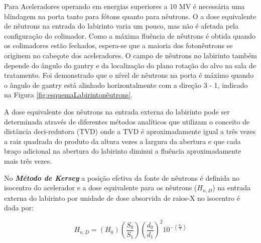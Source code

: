 \documentclass[11pt,a4paper]{article}
\begin{document}
        Para Aceleradores operando em energias superiores a 10 MV é necessária uma blindagem na porta tanto para fótons quanto para nêutrons. O a dose equivalente de nêutrons na entrada do labirinto varia um pouco, mas não é afetada pela configuração do colimador. Como a máxima fluência de nêutrons é obtida quando os colimadores estão fechados, espera-se que a maioria dos fotonêutrons se originem no cabeçote dos aceleradores. O campo de nêutrons no labirinto também depende do ângulo do gantry e da localização do plano rotação do alvo na sala de tratamento. Foi demonstrado que o nível de nêutrons na porta é máximo quando o ângulo de gantry está alinhado horizontalmente com a direção 3 - 1, indicado na Figura \ref{fig:esquemaLabirintonêutrons}. 

        A dose equivalente dos nêutrons na entrada externa do labirinto pode ser determinada através de diferentes métodos analíticos que utilizam o conceito de distância deci-redutora (TVD) onde a TVD é aproximadamente igual a três vezes a raiz quadrada do produto da altura vezes a largura da abertura e que cada braço adicional na abertura do labirinto diminui a fluência aproximadamente mais três vezes. 

        No \textcolor{CarnationPink}{\textbf{\textit{Método de Kersey}}} a posição efetiva da fonte de nêutrons é definida no isocentro do acelerador e a dose equivalente para os nêutrons ($H_{n,D}$) na entrada externa do labirinto por unidade de dose absorvida de raios-X no isocentro é dada por:

        \begin{equation}
            H_{n,D} = (H_0) \left(\frac{S_0}{S_1}\right) \left(\frac{d_0}{d_1}\right)^2 10^{-\left(\frac{d_2}{5}\right)}
        \end{equation}
\end{document}
